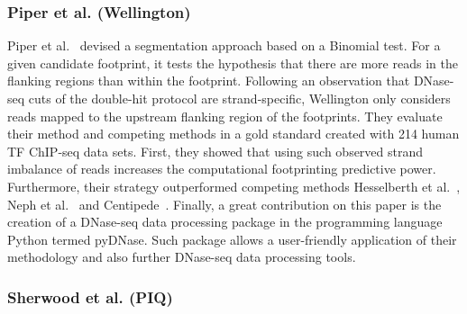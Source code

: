\subsubsection{Piper et al. (Wellington)}
\label{sec:piper.2}

Piper et al.~\cite{piper2013} devised a segmentation approach based on a Binomial test. For a given candidate footprint, it tests the hypothesis that there are more reads in the flanking regions than within the footprint. Following an observation that DNase-seq cuts of the double-hit protocol are strand-specific, Wellington only considers reads mapped to the upstream flanking region of the footprints. They evaluate their method and competing methods in a gold standard created with 214 human TF ChIP-seq data sets. First, they showed that using such observed strand imbalance of reads increases the computational footprinting predictive power. Furthermore, their strategy outperformed competing methods Hesselberth et al.~\cite{hesselberth2009}, Neph et al.~\cite{neph2012a} and Centipede~\cite{pique2011}. Finally, a great contribution on this paper is the creation of a DNase-seq data processing package in the programming language Python termed pyDNase. Such package allows a user-friendly application of their methodology and also further DNase-seq data processing tools.

\subsubsection{Sherwood et al. (PIQ)}
\label{sec:sherwood.2}

